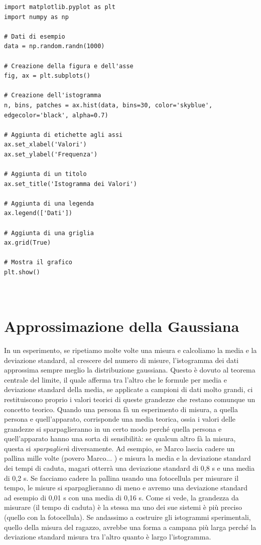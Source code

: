 \documentclass{article}
\begin{document}
\begin{lstlisting}[style=pythonstyle, caption={Script Python per disegnare un'istogramma}]
import matplotlib.pyplot as plt
import numpy as np

# Dati di esempio
data = np.random.randn(1000)

# Creazione della figura e dell'asse
fig, ax = plt.subplots()

# Creazione dell'istogramma
n, bins, patches = ax.hist(data, bins=30, color='skyblue', edgecolor='black', alpha=0.7)

# Aggiunta di etichette agli assi
ax.set_xlabel('Valori')
ax.set_ylabel('Frequenza')

# Aggiunta di un titolo
ax.set_title('Istogramma dei Valori')

# Aggiunta di una legenda
ax.legend(['Dati'])

# Aggiunta di una griglia
ax.grid(True)

# Mostra il grafico
plt.show()



\end{lstlisting}



\section{Approssimazione della Gaussiana}
In un esperimento, se ripetiamo molte volte una misura e calcoliamo la media e la deviazione standard, al crescere del numero di misure, l'istogramma dei dati approssima sempre meglio la distribuzione gaussiana. Questo è dovuto al teorema centrale del limite, il quale afferma tra l'altro che le formule per media e deviazione standard della media, se applicate a campioni di dati molto grandi, ci restituiscono proprio i valori teorici di queste grandezze che restano comunque un concetto teorico. Quando una persona fà un esperimento di misura, a quella persona e quell'apparato, corrisponde una media teorica, ossia i valori delle grandezze si sparpaglieranno in un certo modo perché quella persona e quell'apparato hanno una sorta di sensibilità: se qualcun altro fà la misura, questa si \textit{sparpaglierà} diversamente. Ad esempio, se Marco lascia cadere un pallina mille volte (povero Marco... ) e misura la media e la deviazione standard dei tempi di caduta, magari otterrà una deviazione standard di 0,8 s e una media di 0,2 s. Se facciamo cadere la pallina usando una fotocellula per misurare il tempo, le misure si sparpaglieranno di meno e avremo una deviazione standard ad esempio di 0,01 s con una media di 0,16 s. Come si vede, la grandezza da misurare (il tempo di caduta) è la stessa ma uno dei sue sistemi è più preciso (quello con la fotocellula). Se andassimo a costruire gli istogrammi sperimentali, quello della misura del ragazzo, avrebbe una forma a campana più larga perché la deviazione standard misura tra l'altro quanto è largo l'istogramma. 
\end{document}
